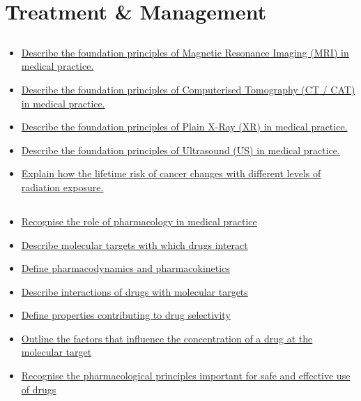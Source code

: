 \documentclass[10pt, a4paper]{article}
\newcommand{\MYhref}[3][blue]{\href{#2}{\color{#1}{#3}}}%
\begin{document}
\section{Treatment \& Management}
\subsection{\MYhref[melbBlue]{https://notion.so/413379c6d2e64589a7ff76d9661c880b}{Principles of Medical Imaging}} \begin{itemize} \item \href{https://www.notion.so/74daedc4ae024b5189b80f31e8d2c850}{Describe the foundation principles of Magnetic Resonance Imaging (MRI) in medical practice.} \item \href{https://www.notion.so/c34fa2b1bb374d7d84cc19dc7e42ba3b}{Describe the foundation principles of Computerised Tomography (CT / CAT) in medical practice.} \item \href{https://www.notion.so/a6c81d9f23284e9cba5eee2b0a666525}{Describe the foundation principles of Plain X-Ray (XR) in medical practice.} \item \href{https://www.notion.so/eda0bd37561d47d6b550057fb35aff16}{Describe the foundation principles of Ultrasound (US) in medical practice.} \item \href{https://www.notion.so/11df6ad110cf4004a3eea61f194ffd57}{Explain how the lifetime risk of cancer changes with different levels of radiation exposure.} \end{itemize}
\subsection{\MYhref[melbBlue]{https://notion.so/7a93d71d5bdd489aaf1d2827fc68a309}{Drug Targets and Action}} \begin{itemize} \item \href{https://www.notion.so/0d9728bd486748748d1edb37015b765a}{Recognise the role of pharmacology in medical practice } \item \href{https://www.notion.so/37980077c0334a19b4c72f69d3e4b1a1}{Describe molecular targets with which drugs interact } \item \href{https://www.notion.so/703cd2adfd2f433e82ea54c4eda89bd1}{Define pharmacodynamics and pharmacokinetics } \item \href{https://www.notion.so/d99abf1028e64baf8ed3331694f66cbb}{Describe interactions of drugs with molecular targets } \item \href{https://www.notion.so/b1532116547741739ec59b2a52f3923e}{Define properties contributing to drug selectivity} \item \href{https://www.notion.so/97b14e29444b44a1bf698496d626fda2}{Outline the factors that influence the concentration of a drug at the molecular target} \item \href{https://www.notion.so/3013c17e5133419f944fa9aab3690ae8}{Recognise the pharmacological principles important for safe and effective use of drugs } \end{itemize}
\end{document}
